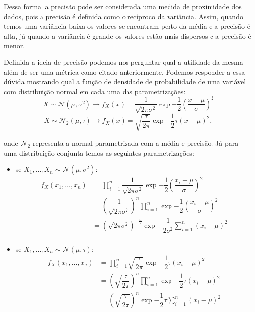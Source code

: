 \documentclass{article}
\begin{document}
	Dessa forma, a precisão pode ser considerada uma medida de proximidade dos dados, pois a precisão é definida como o recíproco da variância. Assim, quando temos uma variância baixa os valores se encontram perto da média e a precisão é alta, já quando a variância é grande os valores estão mais dispersos e a precisão é menor.
	
	Definida a ideia de precisão podemos nos perguntar qual a utilidade da mesma além de ser uma métrica como citado anteriormente. Podemos responder a essa dúvida mostrando qual a função de densidade de probabilidade de uma variável com distribuição normal em cada uma das parametrizações:
	\[X \sim \mathcal{N}(\mu, \sigma^2) \longrightarrow f_X(x) = \dfrac{1}{\sqrt{2\pi \sigma^2}}\exp{-\dfrac{1}{2}\left(\dfrac{x - \mu}{\sigma}\right)^2}\]
	\[X \sim \mathcal{N}_2(\mu, \tau) \longrightarrow f_X(x) = \sqrt{\dfrac{\tau}{2\pi}}\exp{-\dfrac{1}{2}\tau(x - \mu)^2},\]
	
	onde $\mathcal{N}_2$ representa a normal parametrizada com a média e precisão. Já para uma distribuição conjunta temos as seguintes parametrizações:
	\begin{itemize}
		\item
		se $X_1, \dots, X_n \sim \mathcal{N}(\mu, \sigma^2)$:
		\begin{equation*}
		\begin{split}
		f_X(x_1, \dots, x_n) & = \prod_{i = 1}^{n} \dfrac{1}{\sqrt{2\pi \sigma^2}}\exp{-\dfrac{1}{2}\left(\dfrac{x_i - \mu}{\sigma}\right)^2} \\
		& = \left(\dfrac{1}{\sqrt{2\pi \sigma^2}}\right)^n \prod_{i = 1}^{n} \exp{-\dfrac{1}{2}\left(\dfrac{x_i - \mu}{\sigma}\right)^2} \\
		& = \left(\sqrt{2\pi \sigma^2}\right)^{-\frac{n}{2}} \exp{-\dfrac{1}{2\sigma^2}\sum_{i = 1}^{n}\left(x_i - \mu\right)^2} \\
		\end{split}
		\end{equation*}
		
		\item
		se $X_1, \dots, X_n \sim \mathcal{N}(\mu, \tau)$:
		\begin{equation*}
		\begin{split}
		f_X(x_1, \dots, x_n) & = \prod_{i = 1}^{n} \sqrt{\dfrac{\tau}{2\pi}}\exp{-\dfrac{1}{2}\tau(x_i - \mu)^2} \\
		& = \left(\sqrt{\dfrac{\tau}{2\pi}}\right)^n \prod_{i = 1}^{n} \exp{-\dfrac{1}{2}\tau\left(x_i - \mu\right)^2} \\
		& = \left(\sqrt{\dfrac{\tau}{2\pi}}\right)^n \exp{-\dfrac{1}{2}\tau\sum_{i = 1}^{n}\left(x_i - \mu\right)^2} \\
		\end{split}
		\end{equation*}
	\end{itemize}
	
\end{document}
